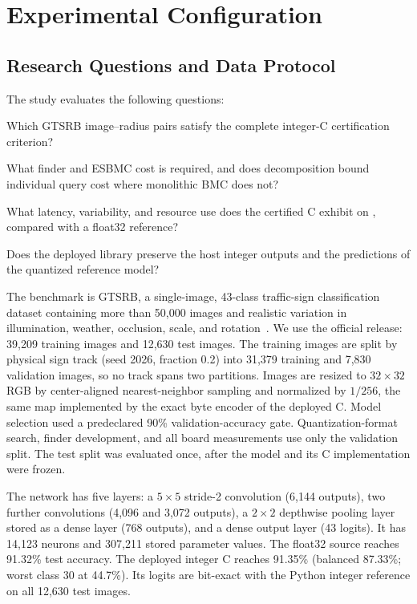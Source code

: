\section{Experimental Configuration}
\label{sec:setup}

\subsection{Research Questions and Data Protocol}
The study evaluates the following questions:
\begin{description}[leftmargin=0.55cm,labelsep=0.2em,itemsep=0pt,topsep=0pt]
  \item[RQ1:] Which GTSRB image--radius pairs satisfy the complete integer-C certification criterion?
  \item[RQ2:] What finder and ESBMC cost is required, and does decomposition bound individual query cost where monolithic BMC does not?
  \item[RQ3:] What latency, variability, and resource use does the certified C exhibit on \AAOS{}, compared with a float32 reference?
  \item[RQ4:] Does the deployed library preserve the host integer outputs and the predictions of the quantized reference model?
\end{description}

The benchmark is GTSRB, a single-image, 43-class traffic-sign classification dataset containing more than 50,000 images and realistic variation in illumination, weather, occlusion, scale, and rotation~\cite{Stallkamp2011GTSRB}. We use the official release: 39,209 training images and 12,630 test images. The training images are split by physical sign track (seed 2026, fraction 0.2) into 31,379 training and 7,830 validation images, so no track spans two partitions. Images are resized to $32\times32$ RGB by center-aligned nearest-neighbor sampling and normalized by $1/256$, the same map implemented by the exact byte encoder of the deployed C. Model selection used a predeclared 90\% validation-accuracy gate. Quantization-format search, finder development, and all board measurements use only the validation split. The test split was evaluated once, after the model and its C implementation were frozen.

The network has five layers: a $5\times5$ stride-2 convolution (6,144 outputs), two further convolutions (4,096 and 3,072 outputs), a $2\times2$ depthwise pooling layer stored as a dense layer (768 outputs), and a dense output layer (43 logits). It has 14,123 neurons and 307,211 stored parameter values. The float32 source reaches 91.32\% test accuracy. The deployed integer C reaches 91.35\% (balanced 87.33\%; worst class 30 at 44.7\%). Its logits are bit-exact with the Python integer reference on all 12,630 test images.

